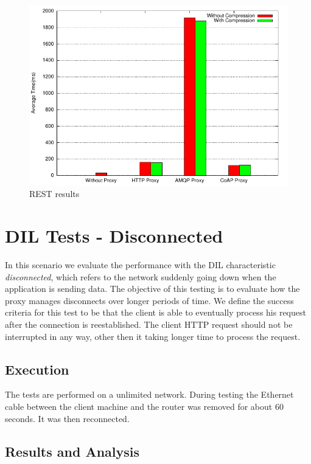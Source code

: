 \begin{figure}[H]
\center
\includegraphics[scale=0.75]{../results/function_tests/rest/result.pdf}
\caption{REST results}
\end{figure}


\section{DIL Tests - Disconnected}

In this scenario we evaluate  the performance with the DIL characteristic
\textit{disconnected}, which refers to the network suddenly going down when the
application is sending data. The objective of this testing is to evaluate how
the proxy manages disconnects over longer periods of time. We define the success
criteria for this test to be that the client is able to eventually process his
request after the connection is reestablished. The client HTTP request should
not be interrupted in any way, other then it taking longer time to process the
request.

\subsection{Execution}

 The tests are performed on a unlimited network. During testing the Ethernet
 cable between the client machine and the router was removed for about 60
 seconds. It was then reconnected.

\subsection{Results and Analysis}

